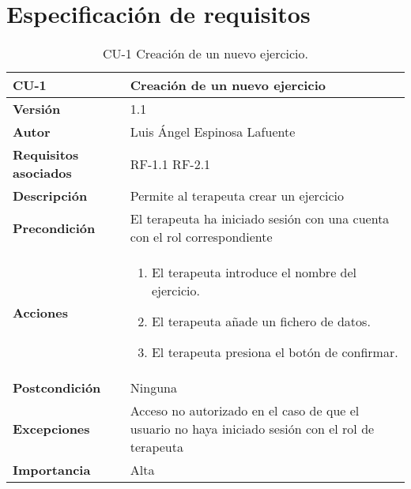 \section{Especificación de requisitos}


\begin{table}[p]
	\centering
	\begin{tabularx}{\linewidth}{ p{} p{} }
		\toprule
		\textbf{CU-1}    & \textbf{Creación de un nuevo ejercicio}\\
		\toprule
		\textbf{Versión}              & 1.1    \\
		\textbf{Autor}                & Luis Ángel Espinosa Lafuente \\
		\textbf{Requisitos asociados} & RF-1.1 RF-2.1 \\
		\textbf{Descripción}          & Permite al terapeuta crear un ejercicio   \\
		\textbf{Precondición}         & El terapeuta ha iniciado sesión con una cuenta con el rol correspondiente \\
		\textbf{Acciones}             &
		\begin{enumerate}
			\def\labelenumi{\arabic{enumi}.}
			\tightlist
			\item El terapeuta introduce el nombre del ejercicio.
			\item El terapeuta añade un fichero de datos.
			\item El terapeuta presiona el botón de confirmar.
		\end{enumerate}\\
		\textbf{Postcondición}        & Ninguna \\
		\textbf{Excepciones}          & Acceso no autorizado en el caso de que el usuario no haya iniciado sesión con el rol de terapeuta  \\
		\textbf{Importancia}          & Alta \\
		\bottomrule
	\end{tabularx}
	\caption{CU-1 Creación de un nuevo ejercicio.}
\end{table}

